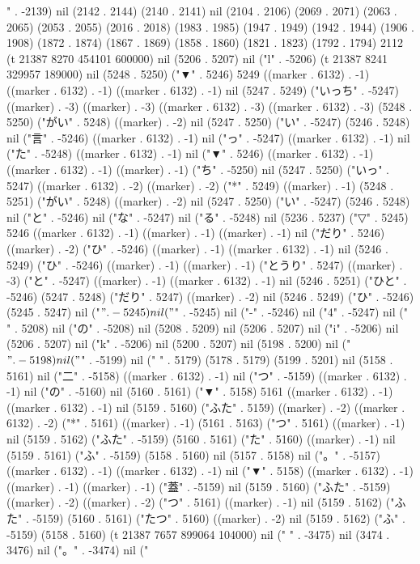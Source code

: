 " . -2139) nil (2142 . 2144) (2140 . 2141) nil (2104 . 2106) (2069 . 2071) (2063 . 2065) (2053 . 2055) (2016 . 2018) (1983 . 1985) (1947 . 1949) (1942 . 1944) (1906 . 1908) (1872 . 1874) (1867 . 1869) (1858 . 1860) (1821 . 1823) (1792 . 1794) 2112 (t 21387 8270 454101 600000) nil (5206 . 5207) nil ("l" . -5206) (t 21387 8241 329957 189000) nil (5248 . 5250) ("▼" . 5246) 5249 ((marker . 6132) . -1) ((marker . 6132) . -1) ((marker . 6132) . -1) nil (5247 . 5249) ("いっち" . -5247) ((marker) . -3) ((marker) . -3) ((marker . 6132) . -3) ((marker . 6132) . -3) (5248 . 5250) ("がい" . 5248) ((marker) . -2) nil (5247 . 5250) ("い" . -5247) (5246 . 5248) nil ("言" . -5246) ((marker . 6132) . -1) nil ("っ" . -5247) ((marker . 6132) . -1) nil ("た" . -5248) ((marker . 6132) . -1) nil ("▼" . 5246) ((marker . 6132) . -1) ((marker . 6132) . -1) ((marker) . -1) ("ち" . -5250) nil (5247 . 5250) ("いっ" . 5247) ((marker . 6132) . -2) ((marker) . -2) ("*" . 5249) ((marker) . -1) (5248 . 5251) ("がい" . 5248) ((marker) . -2) nil (5247 . 5250) ("い" . -5247) (5246 . 5248) nil ("と" . -5246) nil ("な" . -5247) nil ("る" . -5248) nil (5236 . 5237) ("▽" . 5245) 5246 ((marker . 6132) . -1) ((marker) . -1) ((marker) . -1) nil ("だり" . 5246) ((marker) . -2) ("ひ" . -5246) ((marker) . -1) ((marker . 6132) . -1) nil (5246 . 5249) ("ひ" . -5246) ((marker) . -1) ((marker) . -1) ("とうり" . 5247) ((marker) . -3) ("と" . -5247) ((marker) . -1) ((marker . 6132) . -1) nil (5246 . 5251) ("ひと" . -5246) (5247 . 5248) ("だり" . 5247) ((marker) . -2) nil (5246 . 5249) ("ひ" . -5246) (5245 . 5247) nil ("$" . -5245) nil ("$" . -5245) nil ("-" . -5246) nil ("4" . -5247) nil ("
" . 5208) nil ("の" . -5208) nil (5208 . 5209) nil (5206 . 5207) nil ("i" . -5206) nil (5206 . 5207) nil ("k" . -5206) nil (5200 . 5207) nil (5198 . 5200) nil ("$" . -5198) nil ("$" . -5199) nil (" " . 5179) (5178 . 5179) (5199 . 5201) nil (5158 . 5161) nil ("二" . -5158) ((marker . 6132) . -1) nil ("つ" . -5159) ((marker . 6132) . -1) nil ("の" . -5160) nil (5160 . 5161) ("▼" . 5158) 5161 ((marker . 6132) . -1) ((marker . 6132) . -1) nil (5159 . 5160) ("ふた" . 5159) ((marker) . -2) ((marker . 6132) . -2) ("*" . 5161) ((marker) . -1) (5161 . 5163) ("つ" . 5161) ((marker) . -1) nil (5159 . 5162) ("ふた" . -5159) (5160 . 5161) ("た" . 5160) ((marker) . -1) nil (5159 . 5161) ("ふ" . -5159) (5158 . 5160) nil (5157 . 5158) nil ("。" . -5157) ((marker . 6132) . -1) ((marker . 6132) . -1) nil ("▼" . 5158) ((marker . 6132) . -1) ((marker) . -1) ((marker) . -1) ("蓋" . -5159) nil (5159 . 5160) ("ふた" . -5159) ((marker) . -2) ((marker) . -2) ("つ" . 5161) ((marker) . -1) nil (5159 . 5162) ("ふた" . -5159) (5160 . 5161) ("たつ" . 5160) ((marker) . -2) nil (5159 . 5162) ("ふ" . -5159) (5158 . 5160) (t 21387 7657 899064 104000) nil (" " . -3475) nil (3474 . 3476) nil ("。" . -3474) nil ("%

